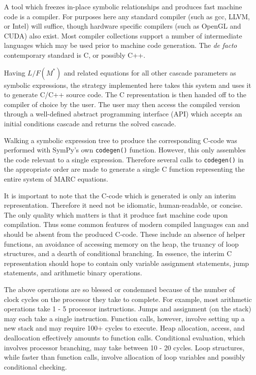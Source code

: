 \documentclass[preprint,12pt]{elsarticle}
\begin{document}
A tool which freezes in-place symbolic relationships and produces fast machine 
code is a compiler.  For purposes here any standard compiler (such as gcc, LLVM, or 
Intel) will suffice, though hardware specific compilers (such as OpenGL and CUDA)
also exist.  Most compiler collections support a number of intermediate languages
which may be used prior to machine code generation.  The \emph{de facto} contemporary
standard is C, or possibly C++.

Having $L/F(M^*)$ and related equations for all other cascade parameters as 
symbolic expressions, the strategy implemented here takes this system and uses
it to generate C/C++ source code.  The C representation is then handed off to the
compiler of choice by the user.  The user may then access the compiled version
through a well-defined abstract programming interface (API) which accepts an initial
conditions cascade and returns the solved cascade.

Walking a symbolic expression tree to produce the corresponding C-code was performed 
with SymPy's own \texttt{codegen()} function.  However, this only assembles the 
code relevant to a single expression.  Therefore several calls to  \texttt{codegen()}
in the appropriate order are made to generate a single C function representing the 
entire system of MARC equations.

It is important to note that the C-code which is generated is only an interim 
representation.  Therefore it need not be idiomatic, human-readable, or concise.
The only quality which matters is that it produce fast machine code upon compilation.
Thus some common features of modern compiled languages can and should be absent 
from the produced C-code.  These include an absence of helper functions, an 
avoidance of accessing memory on the heap, the truancy of loop structures, and a
dearth of conditional branching.  In essence, the interim C representation should
hope to contain only variable assignment statements, jump statements, and 
arithmetic binary operations.

The above operations are so blessed or condemned because of the number of clock
cycles on the processor they take to complete.  For example, most arithmetic 
operations take
1 - 5 processor instructions.  Jumps and assignment (on the stack) may each take
a single instruction.  Function calls, however, involve setting up a new stack
and may require 100+ cycles to execute.  Heap allocation, access, and deallocation
effectively amounts to function calls.  Conditional evaluation, which involves
processor branching, may take between 10 - 20 cycles.  Loop structures, while faster 
than function calls, involve allocation of loop variables and possibly conditional
checking.  
\end{document}
